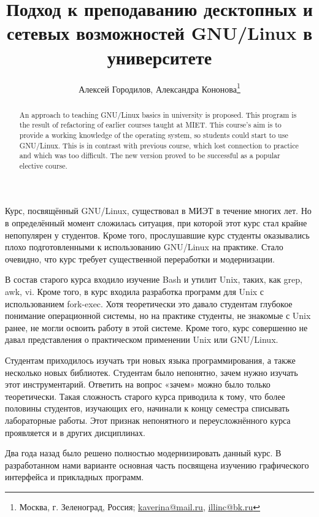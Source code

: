 \documentclass[10pt, a5paper]{article}
\begin{document}
\title{Подход к преподаванию десктопных и сетевых возможностей GNU/Linux в университете}%

\author{Алексей Городилов, Александра Кононова\footnote{Москва, г. Зеленоград, Россия; \url{kaverina@mail.ru}, \url{illinc@bk.ru}}}
\maketitle

\begin{abstract}
An approach to teaching GNU/Linux basics in university is proposed. This program is the result of refactoring of earlier courses taught at MIET. This course's aim is to provide a working knowledge of the operating system, so students could start to use GNU/Linux. This is in contrast with previous course, which lost connection to practice and which was too difficult. The new version proved to be successful as a popular elective course.
\end{abstract}
Курс, посвящённый GNU/Linux, существовал в МИЭТ в течение многих лет. Но в определённый момент сложилась ситуация, при которой этот курс стал крайне непопулярен у студентов. Кроме того, прослушавшие курс студенты оказывались плохо подготовленными к использованию GNU/Linux на практике. Стало очевидно, что курс требует существенной переработки и модернизации.

В состав старого курса входило изучение Bash и утилит Unix, таких, как grep, awk, vi. Кроме того, в курс входила разработка программ для Unix с использованием fork-exec.
Хотя теоретически это давало студентам глубокое понимание операционной системы, но на практике студенты, не знакомые с Unix ранее, не могли освоить работу в этой системе. Кроме того, курс совершенно не давал представления о практическом применении Unix или GNU/Linux.

Студентам приходилось изучать три новых языка программирования, а также несколько новых библиотек.  Студентам было непонятно, зачем нужно изучать этот инструментарий. Ответить на вопрос «зачем» можно было только теоретически. Такая сложность  старого курса приводила к тому, что более половины студентов, изучающих его, начинали к концу семестра списывать лабораторные работы. Этот признак непонятного и переусложнённого курса проявляется и в других дисциплинах.

Два года назад было решено полностью модернизировать данный курс. В разработанном нами варианте основная часть  посвящена изучению графического интерфейса и прикладных программ.
\end{document}
